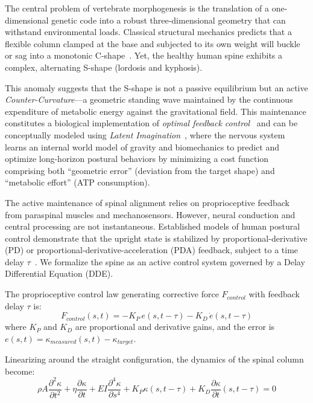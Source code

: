 \documentclass[11pt]{article}
\begin{document}
The central problem of vertebrate morphogenesis is the translation of a one-dimensional genetic code into a robust three-dimensional geometry that can withstand environmental loads. Classical structural mechanics predicts that a flexible column clamped at the base and subjected to its own weight will buckle or sag into a monotonic C-shape~\cite{goriely2017mathematics}. Yet, the healthy human spine exhibits a complex, alternating S-shape (lordosis and kyphosis).

This anomaly suggests that the S-shape is not a passive equilibrium but an active \emph{Counter-Curvature}---a geometric standing wave maintained by the continuous expenditure of metabolic energy against the gravitational field. This maintenance constitutes a biological implementation of \emph{optimal feedback control}~\cite{todorov2002optimal} and can be conceptually modeled using \emph{Latent Imagination}~\cite{hafner2019dreamer}, where the nervous system learns an internal world model of gravity and biomechanics to predict and optimize long-horizon postural behaviors by minimizing a cost function comprising both ``geometric error'' (deviation from the target shape) and ``metabolic effort'' (ATP consumption).

The active maintenance of spinal alignment relies on proprioceptive feedback from paraspinal muscles and mechanosensors. However, neural conduction and central processing are not instantaneous. Established models of human postural control demonstrate that the upright state is stabilized by proportional-derivative (PD) or proportional-derivative-acceleration (PDA) feedback, subject to a time delay $\tau$~\cite{milton2009time, insperger2013acceleration}. We formalize the spine as an active control system governed by a Delay Differential Equation (DDE).

The proprioceptive control law generating corrective force $F_{control}$ with feedback delay $\tau$ is:
\begin{equation}
F_{control}(s,t) = -K_P \, e(s, t-\tau) - K_D \, \dot{e}(s, t-\tau)
\label{eq:pd_control}
\end{equation}
where $K_P$ and $K_D$ are proportional and derivative gains, and the error is $e(s,t) = \kappa_{measured}(s,t) - \kappa_{target}$.

Linearizing around the straight configuration, the dynamics of the spinal column become:
\begin{equation}
\rho A \frac{\partial^2 \kappa}{\partial t^2} + \eta \frac{\partial \kappa}{\partial t} + EI \frac{\partial^4 \kappa}{\partial s^4} + K_P \kappa(s, t-\tau) + K_D \frac{\partial \kappa}{\partial t}(s, t-\tau) = 0
\label{eq:dde_spine}
\end{equation}
\end{document}
